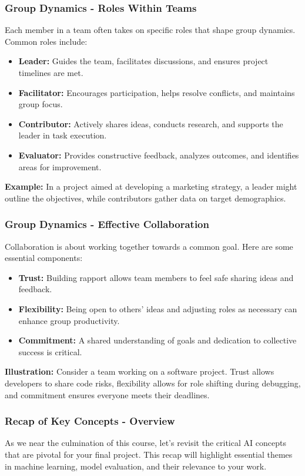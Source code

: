 \documentclass[aspectratio=169]{beamer}
\begin{document}
\begin{frame}[fragile]
    \frametitle{Group Dynamics - Roles Within Teams}
    Each member in a team often takes on specific roles that shape group dynamics. Common roles include:
    \begin{itemize}
        \item \textbf{Leader:} Guides the team, facilitates discussions, and ensures project timelines are met.
        \item \textbf{Facilitator:} Encourages participation, helps resolve conflicts, and maintains group focus.
        \item \textbf{Contributor:} Actively shares ideas, conducts research, and supports the leader in task execution.
        \item \textbf{Evaluator:} Provides constructive feedback, analyzes outcomes, and identifies areas for improvement.
    \end{itemize}
    \textbf{Example:} In a project aimed at developing a marketing strategy, a leader might outline the objectives, 
    while contributors gather data on target demographics.
\end{frame}

\begin{frame}[fragile]
    \frametitle{Group Dynamics - Effective Collaboration}
    Collaboration is about working together towards a common goal. Here are some essential components:
    \begin{itemize}
        \item \textbf{Trust:} Building rapport allows team members to feel safe sharing ideas and feedback.
        \item \textbf{Flexibility:} Being open to others' ideas and adjusting roles as necessary can enhance group productivity.
        \item \textbf{Commitment:} A shared understanding of goals and dedication to collective success is critical.
    \end{itemize}
    \textbf{Illustration:} Consider a team working on a software project. Trust allows developers to share code risks, 
    flexibility allows for role shifting during debugging, and commitment ensures everyone meets their deadlines.
\end{frame}

\begin{frame}[fragile]
    \frametitle{Recap of Key Concepts - Overview}
    As we near the culmination of this course, let's revisit the critical AI concepts that are pivotal for your final project.
    This recap will highlight essential themes in machine learning, model evaluation, and their relevance to your work.
\end{frame}
\end{document}
